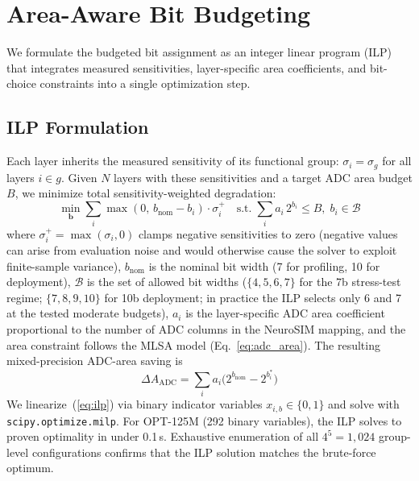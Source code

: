 \documentclass[sigconf,review,anonymous]{acmart}
\begin{document}
\section{Area-Aware Bit Budgeting}
\label{sec:allocation}

We formulate the budgeted bit assignment as an integer linear program (ILP) that integrates measured sensitivities, layer-specific area coefficients, and bit-choice constraints into a single optimization step.

\subsection{ILP Formulation}

Each layer inherits the measured sensitivity of its functional group: $\sigma_i = \sigma_g$ for all layers $i \in g$.
Given $N$ layers with these sensitivities and a target ADC area budget $B$, we minimize total sensitivity-weighted degradation:
\begin{equation}
  \min_{\mathbf{b}} \sum_i \max(0,\, b_\text{nom} - b_i) \cdot \sigma_i^{+}
  \quad \text{s.t.}\; \sum_i a_i \, 2^{b_i} \leq B,\; b_i \in \mathcal{B}
  \label{eq:ilp}
\end{equation}
where $\sigma_i^{+} = \max(\sigma_i, 0)$ clamps negative sensitivities to zero (negative values can arise from evaluation noise and would otherwise cause the solver to exploit finite-sample variance),
$b_\text{nom}$ is the nominal bit width (7 for profiling, 10 for deployment), $\mathcal{B}$ is the set of allowed bit widths ($\{4,5,6,7\}$ for the 7b stress-test regime; $\{7,8,9,10\}$ for 10b deployment; in practice the ILP selects only 6 and 7 at the tested moderate budgets), $a_i$ is the layer-specific ADC area coefficient proportional to the number of ADC columns in the NeuroSIM mapping, and the area constraint follows the MLSA model (Eq.~\ref{eq:adc_area}).
The resulting mixed-precision ADC-area saving is
\begin{equation}
  \Delta A_\text{ADC} = \sum_i a_i \bigl(2^{b_\text{nom}} - 2^{b_i^\ast}\bigr)
  \label{eq:area_saving}
\end{equation}
We linearize~(\ref{eq:ilp}) via binary indicator variables $x_{i,b} \in \{0,1\}$ and solve with \texttt{scipy.optimize.milp}.
For OPT-125M (292 binary variables), the ILP solves to proven optimality in under 0.1\,s.
Exhaustive enumeration of all $4^5{=}1{,}024$ group-level configurations confirms that the ILP solution matches the brute-force optimum.
\end{document}
